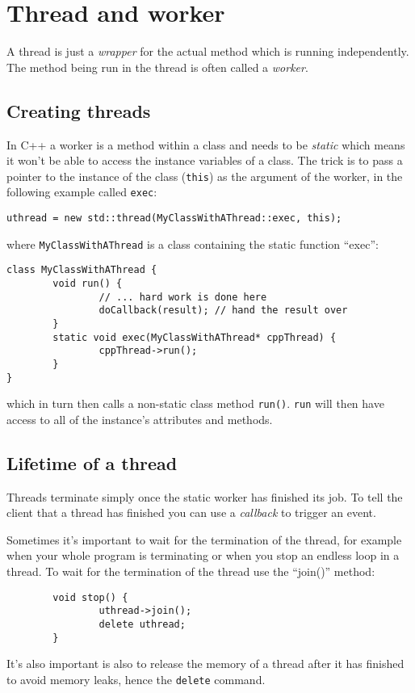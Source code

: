 \documentclass[12pt]{report}
\begin{document}
\section{Thread and worker}
A thread is just a \textsl{wrapper} for the actual method
which is running independently. The method being run in the thread
is often called a \textsl{worker}.

\subsection{Creating threads}
In C++ a worker is a method within
a class and needs to be \textsl{static} which means it won't be
able to access the instance variables of a class. The trick
is to pass a pointer to the instance of the class (\texttt{this}) as the argument of
the worker, in the following example called \texttt{exec}:
\begin{verbatim}
uthread = new std::thread(MyClassWithAThread::exec, this);
\end{verbatim}
where \texttt{MyClassWithAThread} is a class containing the static function ``exec'':
\begin{verbatim}
class MyClassWithAThread {
        void run() {
                // ... hard work is done here
                doCallback(result); // hand the result over
        }
        static void exec(MyClassWithAThread* cppThread) {
                cppThread->run();
        }
}
\end{verbatim}
which in turn then calls a non-static class method \texttt{run()}.
\texttt{run} will then have access to all of the instance's attributes
and methods.

\subsection{Lifetime of a thread}
Threads terminate simply once the static worker has finished its job.
To tell the client that a thread has finished you can use a
\textsl{callback} to trigger an event.

Sometimes it's important to wait for the termination of the thread,
for example when your whole program is terminating or when
you stop an endless loop in a thread. To wait for the termination
of the thread use the ``join()'' method:
\begin{verbatim}
        void stop() {
                uthread->join();
                delete uthread;
        }
\end{verbatim}
It's also important is also to release the memory of a thread after it has finished
to avoid memory leaks, hence the \texttt{delete} command.
\end{document}

